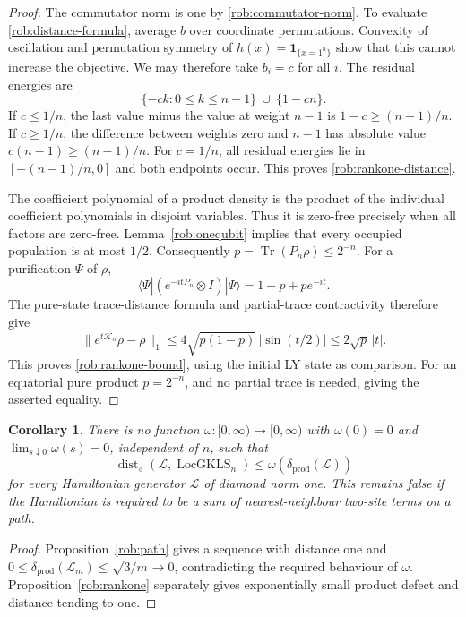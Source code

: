\documentclass[reqno]{amsart}
\newtheorem{corollary}[theorem]{Corollary}
\theoremstyle{definition}
\theoremstyle{remark}
\DeclareMathOperator{\Tr}{Tr}
\begin{document}
\begin{proof}
The commutator norm is one by \eqref{rob:commutator-norm}.
To evaluate \eqref{rob:distance-formula}, average $b$ over coordinate
permutations.  Convexity of oscillation and permutation symmetry of
$h(x)=\mathbf1_{\{x=1^n\}}$ show that this cannot increase the objective.
We may therefore take $b_i=c$ for all $i$.  The residual energies are
\[
 \{-ck:0\leq k\leq n-1\}\ \cup\ \{1-cn\}.
\]
If $c\leq1/n$, the last value minus the value at weight $n-1$ is
$1-c\geq(n-1)/n$.  If $c\geq1/n$, the difference between weights
zero and $n-1$ has absolute value $c(n-1)\geq(n-1)/n$.
For $c=1/n$, all residual energies lie in
$[-(n-1)/n,0]$ and both endpoints occur.  This proves
\eqref{rob:rankone-distance}.

The coefficient polynomial of a product density is the product of
the individual coefficient polynomials in disjoint variables.  Thus
it is zero-free precisely when all factors are zero-free.
Lemma~\ref{rob:onequbit} implies that every occupied population is at
most $1/2$.  Consequently $p=\Tr(P_n\rho)\leq2^{-n}$.
For a purification $\Psi$ of $\rho$,
\[
 \langle\Psi|(e^{-itP_n}\otimes I)|\Psi\rangle
 =1-p+pe^{-it}.
\]
The pure-state trace-distance formula and partial-trace contractivity
therefore give
\[
 \|e^{t\mathcal K_n}\rho-\rho\|_1
 \leq4\sqrt{p(1-p)}\,|\sin(t/2)|
 \leq2\sqrt p\,|t|.
\]
This proves \eqref{rob:rankone-bound}, using the initial LY state as
comparison.  For an equatorial pure product $p=2^{-n}$, and no partial
trace is needed, giving the asserted equality.
\end{proof}

\begin{corollary}
\label{rob:product-obstruction}
There is no function $\omega:[0,\infty)\to[0,\infty)$ with
$\omega(0)=0$ and $\lim_{s\downarrow0}\omega(s)=0$, independent of $n$,
such that
\[
 \operatorname{dist}_\diamond
       (\mathcal L,\operatorname{LocGKLS}_n)
 \leq\omega(\delta_{\mathrm{prod}}(\mathcal L))
\]
for every Hamiltonian generator $\mathcal L$ of diamond norm one.
This remains false if the Hamiltonian is required to be a sum of
nearest-neighbour two-site terms on a path.
\end{corollary}

\begin{proof}
Proposition~\ref{rob:path} gives a sequence with distance one and
$0\leq\delta_{\mathrm{prod}}(\mathcal L_m)\leq\sqrt{3/m}\to0$,
contradicting the required behaviour of $\omega$.
Proposition~\ref{rob:rankone} separately gives exponentially small
product defect and distance tending to one.
\end{proof}
\end{document}
